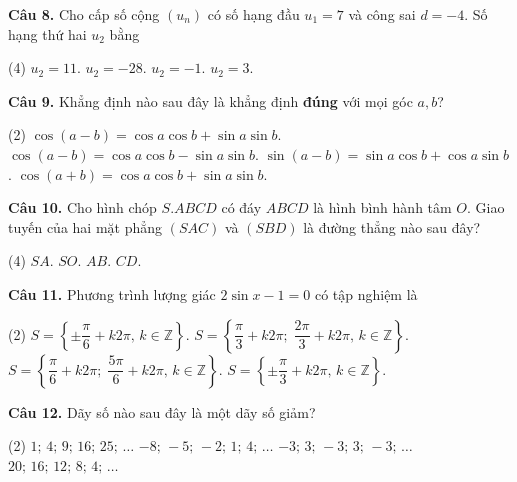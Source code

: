 \documentclass[12pt, a4paper]{article}
\newcommand{\cau}[1]{\vspace{0.12cm}\noindent\textbf{Câu #1. }}
\begin{document}
\cau{8} Cho cấp số cộng $(u_n)$ có số hạng đầu $u_1 = 7$ và công sai $d = -4$. Số hạng thứ hai $u_2$ bằng
\begin{tasks}(4)
\task $u_2 = 11$.
\task $u_2 = -28$.
\task $u_2 = -1$.
\task $u_2 = 3$.
\end{tasks}

\cau{9} Khẳng định nào sau đây là khẳng định \textbf{đúng} với mọi góc $a, b$?
\begin{tasks}(2)
\task $\cos(a - b) = \cos a\cos b + \sin a\sin b$.
\task $\cos(a - b) = \cos a\cos b - \sin a\sin b$.
\task $\sin(a - b) = \sin a\cos b + \cos a\sin b$.
\task $\cos(a + b) = \cos a\cos b + \sin a\sin b$.
\end{tasks}

\cau{10} Cho hình chóp $S.ABCD$ có đáy $ABCD$ là hình bình hành tâm $O$. Giao tuyến của hai mặt phẳng $(SAC)$ và $(SBD)$ là đường thẳng nào sau đây?
\begin{tasks}(4)
\task $SA$.
\task $SO$.
\task $AB$.
\task $CD$.
\end{tasks}

\cau{11} Phương trình lượng giác $2\sin x - 1 = 0$ có tập nghiệm là
\begin{tasks}(2)
\task $S = \left\{\pm\dfrac{\pi}{6} + k2\pi,\, k\in\mathbb{Z}\right\}$.
\task $S = \left\{\dfrac{\pi}{3} + k2\pi;\; \dfrac{2\pi}{3} + k2\pi,\, k\in\mathbb{Z}\right\}$.
\task $S = \left\{\dfrac{\pi}{6} + k2\pi;\; \dfrac{5\pi}{6} + k2\pi,\, k\in\mathbb{Z}\right\}$.
\task $S = \left\{\pm\dfrac{\pi}{3} + k2\pi,\, k\in\mathbb{Z}\right\}$.
\end{tasks}

\cau{12} Dãy số nào sau đây là một dãy số giảm?
\begin{tasks}(2)
\task $1;\, 4;\, 9;\, 16;\, 25;\,\dots$
\task $-8;\,-5;\,-2;\, 1;\, 4;\,\dots$
\task $-3;\, 3;\,-3;\, 3;\,-3;\,\dots$
\task $20;\, 16;\, 12;\, 8;\, 4;\,\dots$
\end{tasks}
\end{document}
